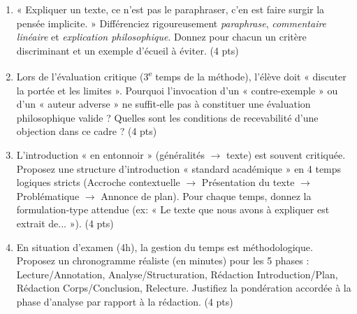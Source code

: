 \documentclass[11pt]{article}
\begin{document}
\begin{exercice}
\begin{enumerate}
    \item « Expliquer un texte, ce n'est pas le paraphraser, c'en est faire surgir la pensée implicite. » Différenciez rigoureusement \textit{paraphrase}, \textit{commentaire linéaire} et \textit{explication philosophique}. Donnez pour chacun un critère discriminant et un exemple d'écueil à éviter. (4 pts)
    \item Lors de l'évaluation critique (3\textsuperscript{e} temps de la méthode), l'élève doit « discuter la portée et les limites ». Pourquoi l'invocation d'un « contre-exemple » ou d'un « auteur adverse » ne suffit-elle pas à constituer une évaluation philosophique valide ? Quelles sont les conditions de recevabilité d'une objection dans ce cadre ? (4 pts)
    \item L'introduction « en entonnoir » (généralités $\to$ texte) est souvent critiquée. Proposez une structure d'introduction « standard académique » en 4 temps logiques stricts (Accroche contextuelle $\to$ Présentation du texte $\to$ Problématique $\to$ Annonce de plan). Pour chaque temps, donnez la formulation-type attendue (ex: « Le texte que nous avons à expliquer est extrait de... »). (4 pts)
    \item En situation d'examen (4h), la gestion du temps est méthodologique. Proposez un chronogramme réaliste (en minutes) pour les 5 phases : Lecture/Annotation, Analyse/Structuration, Rédaction Introduction/Plan, Rédaction Corps/Conclusion, Relecture. Justifiez la pondération accordée à la phase d'analyse par rapport à la rédaction. (4 pts)
\end{enumerate}
\end{exercice}
\end{document}
